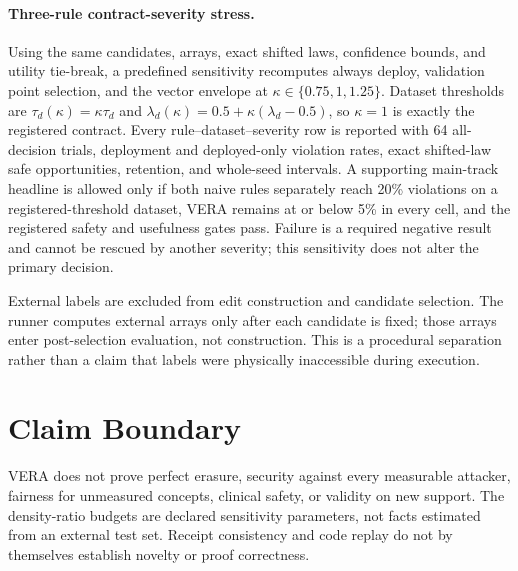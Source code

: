 \paragraph{Three-rule contract-severity stress.}
Using the same candidates, arrays, exact shifted laws, confidence bounds, and
utility tie-break, a predefined sensitivity recomputes always deploy,
validation point selection, and the vector envelope at
$\kappa\in\{0.75,1,1.25\}$. Dataset thresholds are
$\tau_d(\kappa)=\kappa\tau_d$ and
$\lambda_d(\kappa)=0.5+\kappa(\lambda_d-0.5)$, so $\kappa=1$ is exactly the
registered contract. Every rule--dataset--severity row is reported with 64
all-decision trials, deployment and deployed-only violation rates, exact
shifted-law safe opportunities, retention, and whole-seed intervals. A
supporting main-track headline is allowed only if both naive rules separately
reach 20\% violations on a registered-threshold dataset, VERA remains at or
below 5\% in every cell, and the registered safety and usefulness gates pass.
Failure is a required negative result and cannot be rescued by another
severity; this sensitivity does not alter the primary decision.

External labels are excluded from edit construction and candidate selection.
The runner computes external arrays only after each candidate is fixed; those
arrays enter post-selection evaluation, not construction. This is a procedural
separation rather than a claim that labels were physically inaccessible during
execution.


\section{Claim Boundary}

VERA does not prove perfect erasure, security against every measurable
attacker, fairness for unmeasured concepts, clinical safety, or validity on new
support. The density-ratio budgets are declared sensitivity parameters, not
facts estimated from an external test set. Receipt consistency and code replay
do not by themselves establish novelty or proof correctness.
